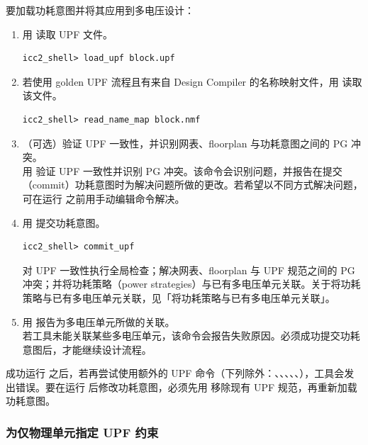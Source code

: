 要加载功耗意图并将其应用到多电压设计：
\begin{enumerate}
  \item 用  读取 UPF 文件。
\begin{lstlisting}
icc2_shell> load_upf block.upf
\end{lstlisting}

  \item 若使用 golden UPF 流程且有来自 Design Compiler 的名称映射文件，用  读取该文件。
\begin{lstlisting}
icc2_shell> read_name_map block.nmf
\end{lstlisting}

  \item （可选）验证 UPF 一致性，并识别网表、floorplan 与功耗意图之间的 PG 冲突。\\
    用  验证 UPF 一致性并识别 PG 冲突。该命令会识别问题，并报告在提交（commit）功耗意图时为解决问题所做的更改。若希望以不同方式解决问题，可在运行  之前用手动编辑命令解决。

  \item 用  提交功耗意图。
\begin{lstlisting}
icc2_shell> commit_upf
\end{lstlisting}
     对 UPF 一致性执行全局检查；解决网表、floorplan 与 UPF 规范之间的 PG 冲突；并将功耗策略（power strategies）与已有多电压单元关联。关于将功耗策略与已有多电压单元关联，见「将功耗策略与已有多电压单元关联」。

  \item 用  报告为多电压单元所做的关联。\\
    若工具未能关联某些多电压单元，该命令会报告失败原因。必须成功提交功耗意图后，才能继续设计流程。
\end{enumerate}

\begin{noteBox}
成功运行  之后，若再尝试使用额外的 UPF 命令（下列除外：、、、、、），工具会发出错误。要在运行  后修改功耗意图，必须先用  移除现有 UPF 规范，再重新加载功耗意图。
\end{noteBox}

\subsubsection{为仅物理单元指定 UPF 约束}
